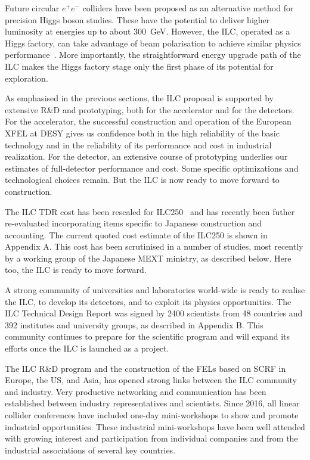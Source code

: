\documentclass[%
reprint,
 floatfix,
 amsmath,amssymb,
 aps,
]{revtex4-1}
\def\ee{e^+e^-}
\begin{document}
Future circular $\ee$ colliders have been proposed as an alternative 
method for precision Higgs boson studies.  These have the potential to
deliver higher luminosity at energies up to about 300~GeV.  However,
the ILC, operated as a Higgs factory, can take advantage of  beam 
polarisation to achieve similar physics
performance~\cite{Barklow:2017suo}.
More importantly, the straightforward energy
upgrade path of the ILC
makes the Higgs factory stage  only
the first phase of its potential for exploration. 

As emphasised in the previous sections, the ILC proposal
is supported by extensive R\&D and prototyping, both for the
accelerator and for the detectors.  For the accelerator,  
the successful construction and
operation 
of the European XFEL at DESY gives
us confidence both in the high reliability of the basic
technology and in the reliability of its performance and cost in 
industrial realization.   For the detector, an extensive course of
prototyping underlies our estimates of full-detector performance 
and cost.  Some specific optimizations and technological choices remain.
But the ILC is now ready to move forward to construction. 

 The ILC TDR
cost has been 
 rescaled for ILC250~\cite{Evans:2017rvt} and has recently been futher
 re-evaluated incorporating items specific to Japanese construction
 and accounting.  The current quoted cost estimate 
of the ILC250 is shown in Appendix A. 
 This cost has  been scrutinised in a number of
studies, most recently by a working group of the Japanese MEXT ministry, as described below.  Here too, the ILC is ready to move forward.

A strong community of universities and laboratories world-wide is
ready to realise the ILC, to develop its detectors, and to exploit its
physics opportunities. 
 The ILC Technical Design Report was signed by
2400 scientists from 48 countries and 392 institutes and university
groups,
 as described in Appendix B.  This community continues
 to prepare for the scientific program and
will expand its efforts once the ILC is launched as a project.
 
The ILC R\&D program and the construction of the FELs based on
SCRF in Europe, the US, and Asia, has opened strong links between the ILC
community 
and industry.  Very productive
 networking and communication has been established between industry
 representatives and scientists. Since 2016,
 all linear collider conferences have included one-day mini-workshops
 to show and promote industrial opportunities. 
These industrial mini-workshops have been well attended
 with growing  interest and participation from individual companies and from the industrial associations of several key countries.
 
\end{document}
